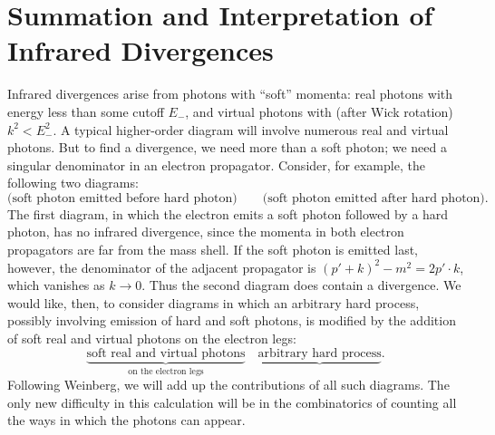 \section{Summation and Interpretation of Infrared Divergences}

Infrared divergences arise from photons with ``soft'' momenta: real photons
with energy less than some cutoff $E_{-}$, and virtual photons with (after
Wick rotation) $k^2 < E_{-}^2$.  A typical higher-order diagram will involve
numerous real and virtual photons.  But to find a divergence, we need more
than a soft photon; we need a singular denominator in an electron propagator.
Consider, for example, the following two diagrams:
\begin{equation}
  \text{(soft photon emitted before hard photon)} \qquad
  \text{(soft photon emitted after hard photon)} .
\end{equation}
The first diagram, in which the electron emits a soft photon followed by a
hard photon, has no infrared divergence, since the momenta in both electron
propagators are far from the mass shell.  If the soft photon is emitted last,
however, the denominator of the adjacent propagator is
$(p'+k)^2 - m^2 = 2p'\cdot k$, which vanishes as $k\to 0$.  Thus the second
diagram does contain a divergence.  We would like, then, to consider diagrams
in which an arbitrary hard process, possibly involving emission of hard and
soft photons, is modified by the addition of soft real and virtual photons on
the electron legs:
\begin{equation}
  \underbrace{\text{soft real and virtual photons}}_{\text{on the electron
    legs}}\quad \underbrace{\text{arbitrary hard process}} .
\end{equation}
Following Weinberg, we will add up the contributions of all such diagrams.
The only new difficulty in this calculation will be in the combinatorics of
counting all the ways in which the photons can appear.

